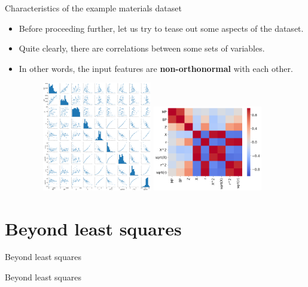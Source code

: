 \documentclass[aspectratio=169]{beamer}
\begin{document}
\begin{frame}{Characteristics of the example materials dataset}
    \begin{itemize}
        \item Before proceeding further, let us try to tease out some aspects of the dataset.
        \item Quite clearly, there are correlations between some sets of variables.
        \item In other words, the input features are \textbf{non-orthonormal} with each other.
        \begin{figure}
            \centering
            \includegraphics[width=0.45\textwidth]{figures/pairplot-materialsdata.png}
            \includegraphics[width=0.45\textwidth]{figures/paircorrelations-materialsdata.png}
        \end{figure}
    \end{itemize}
\end{frame}


\section{Beyond least squares}


\begin{frame}{Beyond least squares}
    \Huge{\centerline{Beyond least squares}}
\end{frame} 
\end{document}
